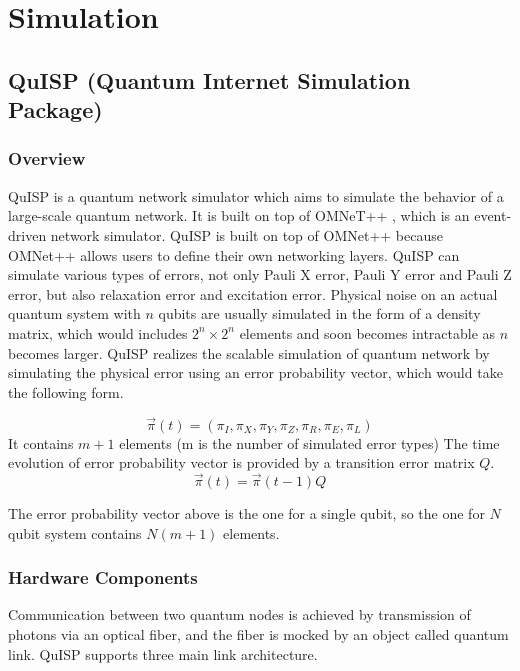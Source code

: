 \chapter{Simulation}
\label{simulation}

\section{QuISP (Quantum Internet Simulation Package)}

\subsection{Overview}

QuISP \cite{satoh2022quisp} is a quantum network simulator which aims to simulate the behavior of a large-scale quantum network. It is built on top of OMNeT++ \cite{10.5555/1416222.1416290}, which is an event-driven network simulator.
QuISP is built on top of OMNet++ because OMNet++ allows users to define their own networking layers.
QuISP can simulate various types of errors, not only Pauli X error, Pauli Y error and Pauli Z error, but also relaxation error and excitation error.
Physical noise on an actual quantum system with $n$ qubits are usually simulated in the form of a density matrix, which would includes $2^n \times 2^n$ elements and soon becomes intractable as $n$ becomes larger.
QuISP realizes the scalable simulation of quantum network by simulating the physical error using an error probability vector, which would take the following form.

\begin{equation}
  \overrightarrow{\pi}(t) = (\pi_I, \pi_X, \pi_Y, \pi_Z, \pi_R, \pi_E, \pi_L)
\end{equation}
It contains $m+1$ elements (m is the number of simulated error types)
The time evolution of error probability vector is provided by a transition error matrix $Q$.
\begin{equation}
  \overrightarrow{\pi}(t) = \overrightarrow{\pi}(t-1)Q 
\end{equation}

The error probability vector above is the one for a single qubit, so the one for $N$ qubit system contains $N(m+1)$ elements.

\subsection{Hardware Components}

Communication between two quantum nodes is achieved by transmission of photons via an optical fiber, and the fiber is mocked by an object called quantum link.
QuISP supports three main link architecture. 

